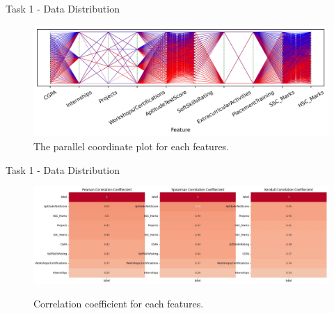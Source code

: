 \documentclass{beamer}
\begin{document}
\begin{frame}{Task 1 - Data Distribution}

  \begin{figure}[H]
    \centering
    \includegraphics[width=\textwidth]{../code/Task1/Analysis/PC.jpg}
    \caption{The parallel coordinate plot for each features.}
  \end{figure}

\end{frame}

\begin{frame}{Task 1 - Data Distribution}

  \begin{figure}[H]
    \centering
    \includegraphics[width=\textwidth]{../code/Task1/Analysis/corrcoef.jpg} \\
    \caption{Correlation coefficient for each features.}
  \end{figure}

\end{frame}
\end{document}
